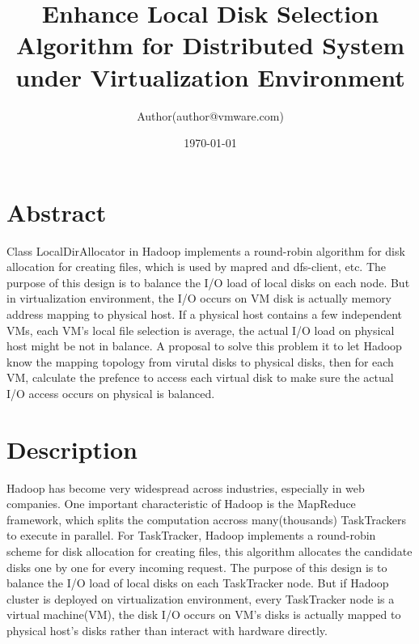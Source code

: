 \documentclass[11pt,a4paper]{article}
\begin{document}
\title{\color{blue}\textbf{Enhance Local Disk Selection Algorithm for Distributed System under Virtualization Environment}}
\author{\small Author(author@vmware.com)\\
}
\date{\today}
\maketitle

\section{\textbf\normalsize{Abstract}}
    
Class LocalDirAllocator in Hadoop implements a round-robin algorithm for
disk allocation for creating files, which is used by mapred and dfs-client,
etc. The purpose of this design is to balance the I/O load of local disks
on each node. But in virtualization environment, the I/O occurs on VM disk
is actually memory address mapping to physical host. If a physical host
contains a few independent VMs, each VM's local file selection is average,
the actual I/O load on physical host might be not in balance. 
A proposal to solve this problem it to let Hadoop know the mapping topology
from virutal disks to physical disks, then for each VM, calculate the prefence
to access each virtual disk to make sure the actual I/O access occurs on physical is balanced. 

\section{\textbf\normalsize{Description}}

Hadoop has become very widespread across industries, 
especially in web companies. One important characteristic of Hadoop is 
the MapReduce framework, which splits the computation accross 
many(thousands) TaskTrackers to execute in parallel. For TaskTracker,
Hadoop implements a round-robin scheme for disk allocation for 
creating files, this algorithm allocates the candidate disks one by 
one for every incoming request. The purpose of this design is to balance 
the I/O load of local disks on each TaskTracker node. But if 
Hadoop cluster is deployed on virtualization environment, every TaskTracker node is 
a virtual machine(VM), the disk I/O occurs on VM's disks is actually 
mapped to physical host's disks rather than interact with hardware directly.
\end{document}
